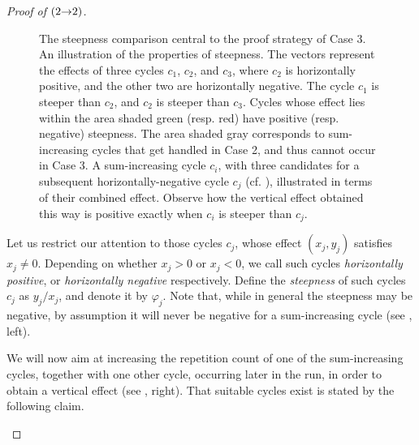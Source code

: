 \begin{proof}[Proof of  $({2}{\rightarrow}{2})$]
\begin{figure}[h]
\caption{
  The steepness comparison central to the proof strategy of Case 3.
  \figleft An illustration of the properties of steepness.
  The vectors represent the effects of three cycles
  $c_1$, $c_2$, and $c_3$, where $c_2$ is horizontally
  positive, and the other two are horizontally negative.
  The cycle $c_1$ is steeper than $c_2$, and $c_2$ is steeper than $c_3$.
  Cycles whose effect lies within the area shaded green (resp. red) have positive (resp. negative) steepness.
  The area shaded gray corresponds to sum-increasing cycles that get handled in Case 2,
  and thus cannot occur in Case 3.
  \figright A sum-increasing cycle $c_i$,
  with three candidates for a subsequent horizontally-negative cycle $c_j$ (cf. ),
  illustrated in terms of their combined effect.
  Observe how the vertical effect obtained this way is positive exactly
  when $c_i$ is steeper than $c_j$.
}
\label{fig:steep}
\end{figure}

Let us restrict our attention to those cycles $c_j$, whose effect 
$(x_j,y_j)$ satisfies $x_j\neq 0$.
Depending on whether $x_j>0$ or $x_j<0$, we call such cycles 
\emph{horizontally positive}, or \emph{horizontally negative} respectively.
Define the \emph{steepness} of such cycles $c_j$ as $y_j/x_j$, and denote it by $\varphi_j$.
Note that, while in general the steepness may be negative,
by assumption it will never be negative for a sum-increasing cycle
(see , left).

We will now aim at increasing 
the repetition count of one of the sum-increasing
cycles, together with one other cycle, occurring later in the run, 
in order to obtain a vertical effect (see , right).
That suitable cycles exist is stated by the following claim.

\begin{figure}[t]
\centering
\begin{tikzpicture}[
    >=stealth,
    scale=1.0,
    every node/.style={font=\small}
]


\end{tikzpicture}
\end{figure}
\end{proof}
